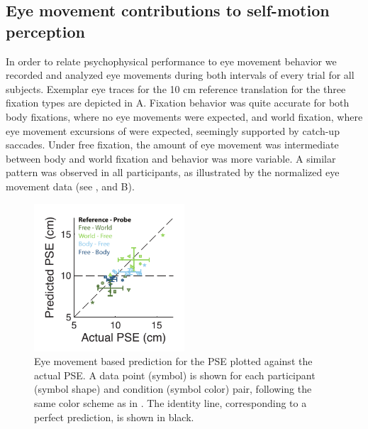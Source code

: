 \subsection{Eye movement contributions to self-motion perception}

In order to relate psychophysical performance to eye movement behavior we recorded and analyzed eye movements during both intervals of every trial for all subjects. Exemplar eye traces for the 10 \si{\centi\metre} reference translation for the three fixation types are depicted in A. Fixation behavior was quite accurate for both body fixations, where no eye movements were expected, and world fixation, where eye movement excursions of  were expected, seemingly supported by  catch-up saccades. Under free fixation, the amount of eye movement was intermediate between body and world fixation and behavior was more variable. A similar pattern was observed in all participants, as illustrated by the normalized eye movement data (see , and B).

\begin{figure}
    \includegraphics[width=0.5\textwidth]{src/paper3/figure4.pdf}

    \caption{Eye movement based prediction for the PSE plotted against the actual PSE.  A data point (symbol) is shown for each participant (symbol shape) and condition (symbol color) pair, following the same color scheme as in . The identity line, corresponding to a perfect prediction, is shown in black.}
    \label{p3:fig4}
\end{figure}

